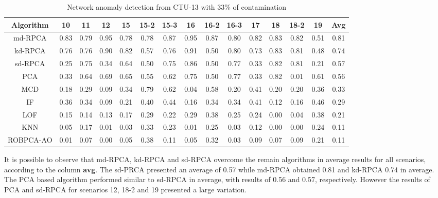 \documentclass[review]{elsarticle}
\begin{document}
\begin{table}[t]
  \centering
  \tiny
  \caption{Network anomaly detection from CTU-13 with 33\% of contamination}
  \label{tab:4.05}
  \begin{tabular}{ c|c|c|c|c|c|c|c|c|c|c|c|c|c|c }
	\toprule
        \textbf{Algorithm}	&\textbf{10}	&\textbf{11}	&\textbf{12}	&\textbf{15}	&\textbf{15-2}	&\textbf{15-3}	&\textbf{16}	&\textbf{16-2}	&\textbf{16-3}	&\textbf{17}	&\textbf{18}	&\textbf{18-2}	&\textbf{19}	&\textbf{Avg} \\ \hline
        md-RPCA     &0.83  &0.79  &0.95  &0.78  &0.78  &0.87  &0.95  &0.87  &0.80  &0.82  &0.83  &0.82  &0.51  &0.81  \\ \hline
        kd-RPCA     &0.76  &0.76  &0.90  &0.82  &0.57  &0.76  &0.91  &0.50  &0.80  &0.73  &0.83  &0.81  &0.48  &0.74  \\ \hline
        sd-RPCA     &0.25  &0.75  &0.34  &0.64  &0.50  &0.75  &0.86  &0.50  &0.77  &0.33  &0.82  &0.81  &0.21  &0.57  \\ \hline
        PCA   &0.33  &0.64  &0.69  &0.65  &0.55  &0.62  &0.75  &0.50  &0.77  &0.33  &0.82  &0.01  &0.61  &0.56  \\ \hline
        MCD   &0.18  &0.29  &0.09  &0.34  &0.79  &0.62  &0.04  &0.58  &0.20  &0.41  &0.20  &0.20  &0.36  &0.33  \\ \hline
        IF    &0.36  &0.34  &0.09  &0.21  &0.40  &0.44  &0.16  &0.34  &0.34  &0.41  &0.12  &0.16  &0.46  &0.29  \\ \hline
        LOF   &0.15  &0.14  &0.13  &0.17  &0.29  &0.22  &0.29  &0.38  &0.25  &0.24  &0.00  &0.04  &0.38  &0.21  \\ \hline
        KNN   &0.05  &0.17  &0.01  &0.03  &0.33  &0.23  &0.01  &0.25  &0.03  &0.12  &0.00  &0.00  &0.24  &0.11  \\ \hline
        ROBPCA-AO   &0.01  &0.07  &0.00  &0.05  &0.38  &0.11  &0.05  &0.32  &0.03  &0.09  &0.07  &0.09  &0.21  &0.11  \\ \hline
    \bottomrule
  \end{tabular}
\end{table}


It is possible to observe that md-RPCA, kd-RPCA and sd-RPCA overcome the remain algorithms in average results for all scenarios, according to the column \textbf{avg}. The sd-PRCA presented an average of 0.57 while md-RPCA obtained 0.81 and kd-RPCA 0.74 in average. The PCA based algorithm performed similar to sd-RPCA in average, with results of 0.56 and 0.57, respectively. However the results of PCA and sd-RPCA for scenarios 12, 18-2 and 19 presented a large variation.
\end{document}
